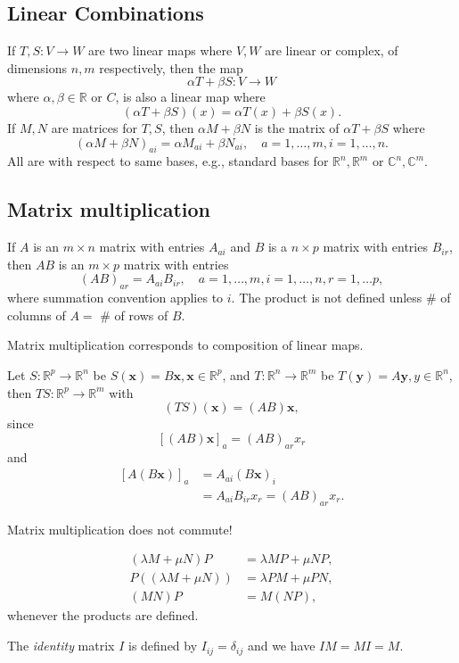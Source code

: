 \documentclass[10pt]{article}
\begin{document}
    \subsection{Linear Combinations}
    If $ T,S:V\to W $ are two linear maps where $ V,W $ are linear or complex, of dimensions $ n,m $ respectively, then the map 
    \[
        \alpha T+\beta S: V\to W
    \]
    where $ \alpha,\beta\in \mathbb{R} $ or $C$, is also a linear map where 
    \[
        (\alpha T+\beta S)(x)=\alpha T(x)+\beta S(x)
    .\]
    If $ M,N $ are matrices for $ T,S $, then $ \alpha M+\beta N $ is the matrix of $\alpha T+\beta S$ where 
    \[
        (\alpha M+\beta N)_{ai}=\alpha M_{ai}+\beta N_{ai},\quad a=1,\dots,m, i=1,\dots,n
    .\]
    All are with respect to same bases, e.g., standard bases for $ \mathbb{R}^{n},\mathbb{R}^{m} $ or $ \mathbb{C}^{n},\mathbb{C}^{m} $.
    \subsection{Matrix multiplication}
    If $A$ is an $m\times n$ matrix with entries $A_{ai}$ and $B$ is a $n\times p$ matrix with entries $B_{ir}$, then $AB$ is an $m\times p$ matrix with entries 
    \[
        (AB)_{ar}=A_{ai}B_{ir}, \quad a=1,\dots,m,i=1,\dots,n,r=1,\dots p,
    \]
    where summation convention applies to $i$. The product is not defined unless \# of columns of $A=$ \# of rows of $B$.

    Matrix multiplication corresponds to composition of linear maps.
    \begin{example}
        Let $ S:\mathbb{R}^{p}\to \mathbb{R}^{n} $ be $ S(\mathbf{x})=B \mathbf{x}, \mathbf{x}\in \mathbb{R}^{p} $, and $ T:\mathbb{R}^{n}\to \mathbb{R}^{m} $ be $ T(\mathbf{y})=A \mathbf{y}, y\in \mathbb{R}^{n} $, then $ TS:\mathbb{R}^{p}\to \mathbb{R}^{m} $ with 
        \[
            (TS)(\mathbf{x})=(AB) \mathbf{x}
        ,\]
        since 
        \[
            [(AB)\mathbf{x}]_{a}=(AB)_{ar}x_r
        \]
        and
        \[
            \begin{aligned}
                [A(B \mathbf{x})]_{a}&=A_{ai}(B \mathbf{x})_{i}\\
                &= A_{ai}B_{ir}x_r =(AB)_{ar}x_r.
            \end{aligned}
        \]
    \end{example}
    \begin{remark}
        Matrix multiplication does not commute!
    \end{remark}
    \begin{proposition}\label{prop:Properties of matrix multiplication}
        \[\begin{aligned}
             (\lambda M+\mu N)P&=\lambda M P+\mu N P,\\
             P((\lambda M+\mu N))&=\lambda PM+ \mu PN,\\
            (MN)P&=M(NP),
        \end{aligned}\]
        whenever the products are defined.
    \end{proposition}
    The \textit{identity} matrix $I$ is defined by $ I_{ij}=\delta_{ij} $ and we have $ IM=MI=M $.
\end{document}
